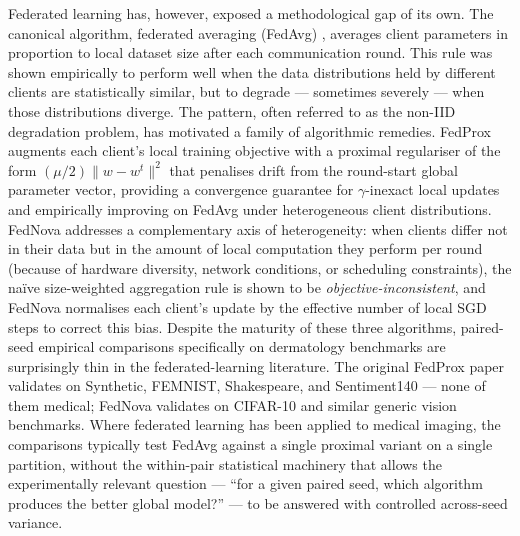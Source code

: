 \documentclass[11pt,a4paper]{article}
\begin{document}
Federated learning has, however, exposed a methodological gap of its
own. The canonical algorithm, federated averaging (FedAvg)
\citep{mcmahan2017fedavg}, averages client parameters in proportion
to local dataset size after each communication round. This rule was
shown empirically to perform well when the data distributions held
by different clients are statistically similar, but to degrade ---
sometimes severely --- when those distributions diverge. The pattern,
often referred to as the non-IID degradation problem, has motivated
a family of algorithmic remedies. FedProx \citep{li2020fedprox}
augments each client's local training objective with a proximal
regulariser of the form $(\mu/2)\lVert w - w^t \rVert^2$ that
penalises drift from the round-start global parameter vector,
providing a convergence guarantee for $\gamma$-inexact local updates
and empirically improving on FedAvg under heterogeneous client
distributions. FedNova \citep{wang2020fednova} addresses a
complementary axis of heterogeneity: when clients differ not in their
data but in the amount of local computation they perform per round
(because of hardware diversity, network conditions, or scheduling
constraints), the naïve size-weighted aggregation rule is shown to
be \emph{objective-inconsistent}, and FedNova normalises each
client's update by the effective number of local SGD steps to
correct this bias. Despite the maturity of these three algorithms,
paired-seed empirical comparisons specifically on dermatology
benchmarks are surprisingly thin in the federated-learning
literature. The original FedProx paper validates on Synthetic,
FEMNIST, Shakespeare, and Sentiment140 --- none of them medical;
FedNova validates on CIFAR-10 and similar generic vision benchmarks.
Where federated learning has been applied to medical imaging, the
comparisons typically test FedAvg against a single proximal variant
on a single partition, without the within-pair statistical machinery
that allows the experimentally relevant question --- ``for a given
paired seed, which algorithm produces the better global model?''
--- to be answered with controlled across-seed variance.
\end{document}
